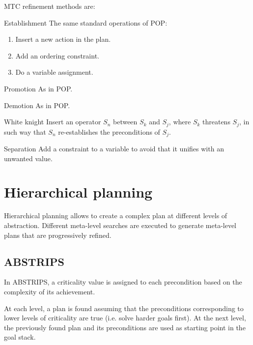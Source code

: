 MTC refinement methods are:
\begin{descriptionlist}
    \item[Establishment] 
        The same standard operations of POP:
        \begin{enumerate}
            \item Insert a new action in the plan.
            \item Add an ordering constraint.
            \item Do a variable assignment.
        \end{enumerate}

    \item[Promotion] 
        As in POP.

    \item[Demotion] 
        As in POP.

    \item[White knight] 
        Insert an operator $S_n$ between $S_k$ and $S_j$, where $S_k$ threatens $S_j$,
        in such way that $S_n$ re-establishes the preconditions of $S_j$.

    \item[Separation] 
        Add a constraint to a variable to avoid that it unifies with an unwanted value.
\end{descriptionlist}



\section{Hierarchical planning}
Hierarchical planning allows to create a complex plan at different levels of abstraction.
Different meta-level searches are executed to generate meta-level plans that are progressively refined.


\subsection{ABSTRIPS}
In ABSTRIPS, a criticality value is assigned to each precondition based on the complexity of its achievement.

At each level, a plan is found assuming that the preconditions corresponding to lower levels of criticality are true
(i.e. solve harder goals first).
At the next level, the previously found plan and its preconditions are used as starting point in the goal stack.

